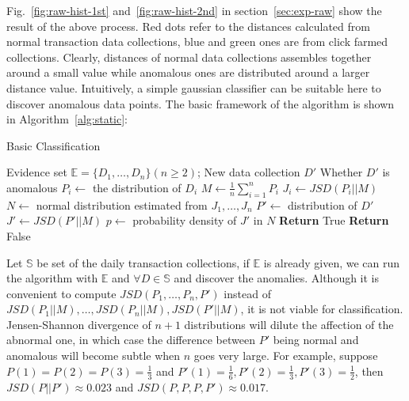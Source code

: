 \documentclass[a4paper]{IEEEtran}
\begin{document}
			Fig.~\ref{fig:raw-hist-1st} and~\ref{fig:raw-hist-2nd} in section~\ref{sec:exp-raw} show the result of the above process. Red dots refer to the distances calculated from normal transaction data collections, blue and green ones are from click farmed collections. Clearly, distances of normal data collections assembles together around a small value while anomalous ones are distributed around a larger distance value. Intuitively, a simple gaussian classifier can be suitable here to discover anomalous data points. The basic framework of the algorithm is shown in Algorithm~\ref{alg:static}:
			
			\begin{algorithm}[!t]
				\caption{Basic Classification}
				\label{alg:static}
				\begin{algorithmic}[1]
					\Require Evidence set $\mathbb{E} = \{D_1, \dots, D_n\}(n\ge2)$; New data collection $D'$
					\Ensure Whether $D'$ is anomalous
					\State $P_i \gets$ the distribution of $D_i$
					\EndFor
					\State $M \gets \frac{1}{n}\sum_{i=1}^{n}P_i$\label{line:population-estimation}
					\State $J_i \gets JSD(P_i||M)$
					\EndFor
					\State $N \gets$ normal distribution estimated from $J_1, \dots, J_n$
					\State $P' \gets$ distribution of $D'$
					\State $J' \gets JSD(P'||M)$
					\State $p \gets$ probability density of $J'$ in $N$
					\State \textbf{Return} True
					\Else
					\State \textbf{Return} False
					\EndIf
				\end{algorithmic}
			\end{algorithm}
			
			Let $\mathbb{S}$ be set of the daily transaction collections, if $\mathbb{E}$ is already given, we can run the algorithm with $\mathbb{E}$ and $\forall D \in \mathbb{S}$ and discover the anomalies. Although it is convenient to compute $JSD(P_1, \dots, P_n, P')$ instead of $JSD(P_1||M), \dots, JSD(P_n||M), JSD(P'||M)$, it is not viable for classification. Jensen-Shannon divergence of $n+1$ distributions will dilute the affection of the abnormal one, in which case the difference between $P'$ being normal and anomalous will become subtle when $n$ goes very large. For example, suppose $P(1) = P(2) = P(3) = \frac{1}{3}$ and $P'(1) = \frac{1}{6}, P'(2) = \frac{1}{3}, P'(3) = \frac{1}{2}$, then $JSD(P||P') \approx 0.023$ and $JSD(P, P, P, P') \approx 0.017$.
			
\end{document}
